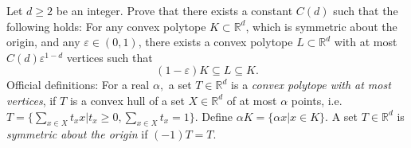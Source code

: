 Let \(d \ge 2\) be an integer. Prove that there exists a constant \(C(d)\) such that the following holds: For any convex polytope \(K\subset \mathbb{R}^d\), which is symmetric about the origin, and any \(\varepsilon \in (0, 1)\), there exists a convex polytope \(L \subset \mathbb{R}^d\) with at most \(C(d) \varepsilon^{1-d}\) vertices such that
\[(1-\varepsilon)K \subseteq L \subseteq K.\]
Official definitions: For a real \(\alpha,\) a set \(T \in \mathbb{R}^d\) is a \textit{convex polytope with at most  vertices}, if \(T\) is a convex hull of a set \(X \in \mathbb{R}^d\) of at most \(\alpha\) points, i.e. \(T = \{\sum\limits_{x\in X} t_x x | t_x \ge 0, \sum\limits_{x \in X} t_x = 1\}.\) Define \(\alpha K = \{\alpha x | x \in K\}.\) A set \(T \in \mathbb{R}^d\) is \textit{symmetric about the origin} if \((-1)T = T.\)
